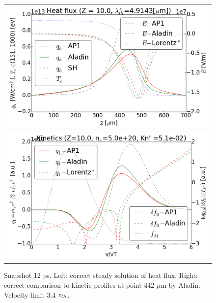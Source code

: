 \begin{figure}[tbh]
  \begin{center}
    \begin{tabular}{c}
      \includegraphics[width=\figscale\textwidth]{../VFPdata/C7_Aladin_case3_heatflux.png} \\
      \includegraphics[width=\figscale\textwidth]{../VFPdata/C7_Aladin_case3_kinetics.png}
    \end{tabular}
  \caption{  
  Snapshot 12 ps. Left: correct steady solution of heat flux. 
  Right: correct comparison to kinetic profiles at point 442 $\mu$m by Aladin. 
  Velocity limit 3.4 $v_{th}$.
  }
  \end{center}
  \label{fig:C7_Aladin_case3}
\end{figure}


